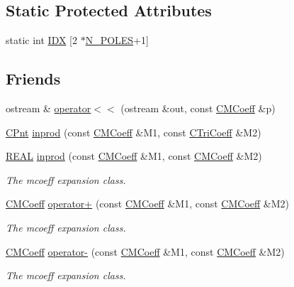\subsection*{Static Protected Attributes}
\begin{DoxyCompactItemize}
\item 
static int \hyperlink{classCMCoeff_ab1882e6a0df777b1acffadf55844dc92}{I\-D\-X} \mbox{[}2 $\ast$\hyperlink{mcoeff_8h_ac23f9c13c5d07d9ce386f7a830c35e5a}{N\-\_\-\-P\-O\-L\-E\-S}+1\mbox{]}
\end{DoxyCompactItemize}
\subsection*{Friends}
\begin{DoxyCompactItemize}
\item 
ostream \& \hyperlink{classCMCoeff_af219e14c617a293aad17ddf8f055db85}{operator$<$$<$} (ostream \&out, const \hyperlink{classCMCoeff}{C\-M\-Coeff} \&p)
\item 
\hyperlink{classCPnt}{C\-Pnt} \hyperlink{classCMCoeff_a095588ecdb857546a57e3f8f33ec983d}{inprod} (const \hyperlink{classCMCoeff}{C\-M\-Coeff} \&M1, const \hyperlink{classCTriCoeff}{C\-Tri\-Coeff} \&M2)
\item 
\hyperlink{util_8h_a5821460e95a0800cf9f24c38915cbbde}{R\-E\-A\-L} \hyperlink{classCMCoeff_a90c84c259a220e291cebf52d99560c61}{inprod} (const \hyperlink{classCMCoeff}{C\-M\-Coeff} \&M1, const \hyperlink{classCMCoeff}{C\-M\-Coeff} \&M2)
\begin{DoxyCompactList}\small\item\em The mcoeff expansion class. \end{DoxyCompactList}\item 
\hyperlink{classCMCoeff}{C\-M\-Coeff} \hyperlink{classCMCoeff_ab6e8a538afe3d4f8de9c1fa4904479ec}{operator+} (const \hyperlink{classCMCoeff}{C\-M\-Coeff} \&M1, const \hyperlink{classCMCoeff}{C\-M\-Coeff} \&M2)
\begin{DoxyCompactList}\small\item\em The mcoeff expansion class. \end{DoxyCompactList}\item 
\hyperlink{classCMCoeff}{C\-M\-Coeff} \hyperlink{classCMCoeff_a2f5f513c1e1864710b85443edbbc311a}{operator-\/} (const \hyperlink{classCMCoeff}{C\-M\-Coeff} \&M1, const \hyperlink{classCMCoeff}{C\-M\-Coeff} \&M2)
\begin{DoxyCompactList}\small\item\em The mcoeff expansion class. \end{DoxyCompactList}\item 

\end{DoxyCompactItemize}
